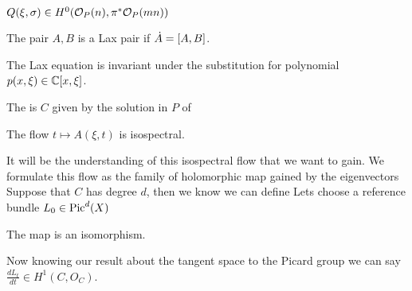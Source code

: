 \documentclass{article}
\begin{document}
\begin{lemma}
	$Q(\xi,\sigma) \in H^0(\mc{O}_P(n), \pi^\ast \mc{O}_P(mn))$
\end{lemma}

\begin{definition}
	The pair $A,B$ is a Lax pair if $\dot{A} = \comm[A]{B}$. 
\end{definition}

\begin{prop}
	The Lax equation is invariant under the substitution 
for polynomial $p(x,\xi) \in \mbb{C}[x,\xi]$. 
\end{prop}

\begin{definition}
	The  is $C$ given by the solution in $P$ of 
\end{definition}

\begin{prop}
	The flow $t \mapsto A(\xi,t)$ is isospectral.
\end{prop}

It will be the understanding of this isospectral flow that we want to gain. We formulate this flow as the family of holomorphic map gained by the eigenvectors 
Suppose that $C$ has degree $d$, then we know we can define 
Lets choose a reference bundle $L_0 \in \Pic^d(X)$ 
\begin{lemma}
	The map 
is an isomorphism. 
\end{lemma}
Now knowing our result about the tangent space to the Picard group we can say $\frac{dL_t}{dt} \in H^1(C,O_C)$. 


\end{document}
